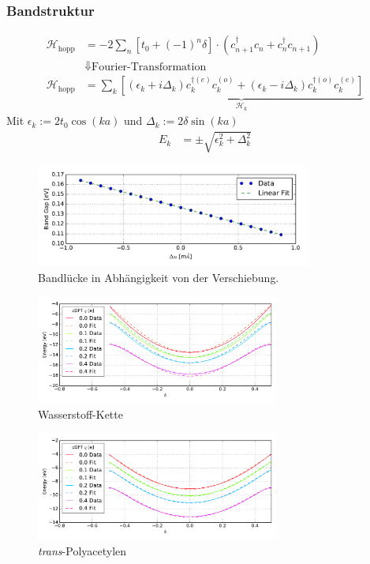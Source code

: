 \begin{frame}
\frametitle{Bandstruktur}
\begin{align*}
\mathcal{H}_\text{hopp} &= -2\sum_n \left[t_0 + (-1)^n\delta\right]\cdot\left(c_{n+1}^\dagger c_n + c_n^\dagger c_{n+1}\right)\\
&\Downarrow\text{Fourier-Transformation}\\
\mathcal{H}_\text{hopp} &= \sum_k \underbrace{\left[
	\left(\epsilon_k + i\Delta_k\right)c_{k}^{\dagger(e)}c_{k}^{(o)} + \left(\epsilon_k-i\Delta_k \right)	c_{k}^{\dagger(o)}c_{k}^{(e)}\right]}_{\mathcal{H}_k}
\end{align*}
Mit $\epsilon_k := 2t_0\cos(ka)$ und $\Delta_k := 2\delta\sin(ka)$\\
\begin{align*}
E_k &= \pm \sqrt{\epsilon_k^2+\Delta_k^2}
\label{equation_energy_band}
\end{align*}
\end{frame}

\begin{frame}
\begin{figure}
	\centering
	\includegraphics[width = 9cm]{Images/polyacetylene/bands/alpha}
	\caption{Bandlücke in Abhängigkeit von der Verschiebung.}
	\label{image_alpha_fit}
\end{figure}
\end{frame}

\begin{frame}
\begin{figure}
\centering
\includegraphics[width = 8cm]{Images/Hydrogen/charging/3D_cuts}
\caption{Wasserstoff-Kette}
\label{image_hydrogen_3D_slices}
\end{figure}
\vspace*{-.7cm}
\begin{figure}
\centering
\includegraphics[width = 8cm]{Images/polyacetylene/charging/3D_cuts}
\caption{\emph{trans}-Polyacetylen}
\end{figure}
\end{frame}


